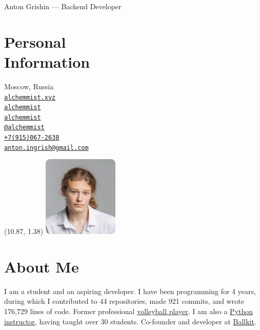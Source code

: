 \documentclass[margin,line]{resume}
\begin{document}
{\vspace*{-13mm}\sc \large Anton Grishin --- Backend Developer} \\
\begin{resume}
  \begin{minipage}[t]{0.55\textwidth}
    \section{\mysidestyle Personal\\Information}
    Moscow, Russia \\
    \faHome  \space
    \href{https://alchemmist.xyz}{\texttt{alchemmist.xyz}} \\
    \faGithub  \space
    \href{https://github.com/alchemmist/}{\texttt{alchemmist}} \\
    \faLinkedin \space
    \href{https://www.linkedin.com/in/alchemmist/}{\texttt{alchemmist}}
    \\
    \faPaperPlane \space \href{https://t.me/alchemmist}{\texttt{@alchemmist}} \\
    \faPhone \space
    \href{tel:+1234567890}{\color{blue}\texttt{+7(915)067-2638}}  \\
    \faEnvelope \space
    \href{mailto:anton.ingrish@gmail.com}{\color{blue}\texttt{anton.ingrish@gmail.com}}
  \end{minipage}

  \begin{minipage}[H]{0.18\textwidth}
    \begin{textblock}{7}(10.87, 1.38)
      \includegraphics[width=0.270\textwidth]{../images/avatar.png}
    \end{textblock}
  \end{minipage}

  \vspace{-7mm}
  \section{\mysidestyle About Me}
  I am a student and an aspiring developer. I have been programming
  for 4 years, during which I contributed to 44 repositories, made
  921 commits, and wrote 176,729 lines of code. Former professional
  \href{https://alchemmist.github.io/CV/attachments/sport.pdf}{volleyball
  player}. I am also a
  \href{https://www.avito.ru/moskva/predlozheniya_uslug/prepodavatel_programmirovaniya_na_python_2556461612}{Python
  instructor}, having taught over 30 students. Co-founder and
  developer at \href{https://ballkit.ru/}{Ballkit}.


\end{resume}
\end{document}
